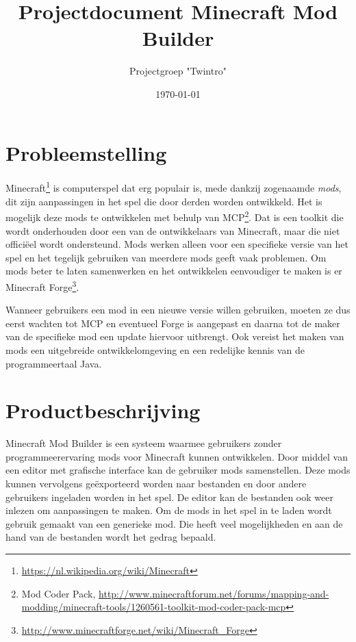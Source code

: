 \documentclass{article}
\begin{document}
\title{Projectdocument Minecraft Mod Builder}
\author{Projectgroep "Twintro"}
\date{\today}

\maketitle

\tableofcontents

\newpage

\section{Probleemstelling}
	Minecraft\footnote{\url{https://nl.wikipedia.org/wiki/Minecraft}} is computerspel dat erg populair is, mede dankzij zogenaamde \emph{mods}, dit zijn aanpassingen in het spel die door derden worden ontwikkeld. Het is mogelijk deze mods te ontwikkelen met behulp van MCP\footnote{Mod Coder Pack, \url{http://www.minecraftforum.net/forums/mapping-and-modding/minecraft-tools/1260561-toolkit-mod-coder-pack-mcp}}. Dat is een toolkit die wordt onderhouden door een van de ontwikkelaars van Minecraft, maar die niet offici\"eel wordt ondersteund. Mods werken alleen voor een specifieke versie van het spel en het tegelijk gebruiken van meerdere mods geeft vaak problemen. Om mods beter te laten samenwerken en het ontwikkelen eenvoudiger te maken is er Minecraft Forge\footnote{\url{http://www.minecraftforge.net/wiki/Minecraft_Forge}}.
	
	Wanneer gebruikers een mod in een nieuwe versie willen gebruiken, moeten ze dus eerst wachten tot MCP en eventueel Forge is aangepast en daarna tot de maker van de specifieke mod een update hiervoor uitbrengt. Ook vereist het maken van mods een uitgebreide ontwikkelomgeving en een redelijke kennis van de programmeertaal Java.

\section{Productbeschrijving}
	Minecraft Mod Builder is een systeem waarmee gebruikers zonder programmeerervaring mods voor Minecraft kunnen ontwikkelen. Door middel van een editor met grafische interface kan de gebruiker mods samenstellen. Deze mods kunnen vervolgens ge\"exporteerd worden naar bestanden en door andere gebruikers ingeladen worden in het spel. De editor kan de bestanden ook weer inlezen om aanpassingen te maken. Om de mods in het spel in te laden wordt gebruik gemaakt van een generieke mod. Die heeft veel mogelijkheden en aan de hand van de bestanden wordt het gedrag bepaald.
	
\end{document}
